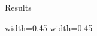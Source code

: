 \begin{frame} 
\begin{center}
 \Huge Results
\end{center}

\end{frame}
\begin{frame}
   \begin{multicols}{2}
      {width=0.45\textwidth} {}
      {width=0.45\textwidth} {}
   \end{multicols}
\end{frame}
\begin{frame}
   \begin{multicols}{2}
      {}
      {}
   \end{multicols}

	
\end{frame}
\begin{frame}
   \begin{multicols}{2}
      {}
      {}
   \end{multicols}

	
\end{frame}
\begin{frame}
   \begin{multicols}{2}
      {}
      {}
   \end{multicols}

	
\end{frame}
\begin{frame}
   \begin{multicols}{2}
      {}
      {}
   \end{multicols}

	
\end{frame}
\begin{frame}
   \begin{multicols}{2}
      {}
      {}
   \end{multicols}

	
\end{frame}
